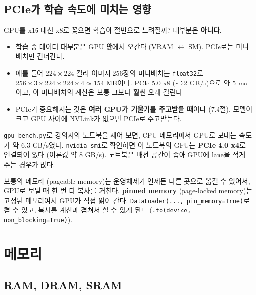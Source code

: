 \documentclass[11pt,a4paper]{article}
\begin{document}
\subsection{PCIe가 학습 속도에 미치는 영향}\label{sec:pcie_matters}

GPU를 x16 대신 x8로 꽂으면 학습이 절반으로 느려질까? 대부분은 \textbf{아니다}.

\begin{itemize}[leftmargin=1.5em]
\item 학습 중 데이터 대부분은 GPU \textbf{안}에서 오간다 (VRAM $\leftrightarrow$ SM). PCIe로는 미니배치만 건너간다.
\item 예를 들어 $224\times224$ 컬러 이미지 $256$장의 미니배치는 \texttt{float32}로 $256\times3\times224\times224\times4\approx154$ MB이다.
PCIe 5.0 x8 ($\sim$32 GB/s)으로 약 $5$ ms이고, 이 미니배치의 계산은 보통 그보다 훨씬 오래 걸린다.
\item PCIe가 중요해지는 것은 \textbf{여러 GPU가 기울기를 주고받을 때}이다 (7.4절). 모델이 크고 GPU 사이에 NVLink가 없으면 PCIe로 주고받는다.
\end{itemize}

\texttt{gpu\_bench.py}로 강의자의 노트북을 재어 보면, CPU 메모리에서 GPU로 보내는 속도가 약 $6.3$ GB/s였다.
\texttt{nvidia-smi}로 확인하면 이 노트북의 GPU는 \textbf{PCIe 4.0 x4}로 연결되어 있다 (이론값 약 $8$ GB/s).
노트북은 배선 공간이 좁아 GPU에 lane을 적게 주는 경우가 많다.

\begin{remarkbox}
보통의 메모리 (pageable memory)는 운영체제가 언제든 다른 곳으로 옮길 수 있어서, GPU로 보낼 때 한 번 더 복사를 거친다.
\textbf{pinned memory} (page-locked memory)는 고정된 메모리여서 GPU가 직접 읽어 간다.
\texttt{DataLoader(..., pin\_memory=True)}로 켤 수 있고, 복사를 계산과 겹쳐서 할 수 있게 된다 (\texttt{.to(device, non\_blocking=True)}).
\end{remarkbox}

\section{메모리}\label{sec:memory}

\subsection{RAM, DRAM, SRAM}\label{sec:ram}
\end{document}
